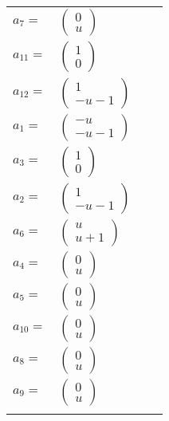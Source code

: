 \documentclass[1p]{elsarticle_modified}
\theoremstyle{definition}
\begin{document}
\begin{tabular}{m{7pt} m{180pt} m{7pt} m{180pt} }
\flushright $a_{7}=$&$\begin{pmatrix}0\\u\end{pmatrix}$ \\
\flushright $a_{11}=$&$\begin{pmatrix}1\\0\end{pmatrix}$ \\
\flushright $a_{12}=$&$\begin{pmatrix}1\\- u-1\end{pmatrix}$ \\
\flushright $a_{1}=$&$\begin{pmatrix}- u\\- u-1\end{pmatrix}$ \\
\flushright $a_{3}=$&$\begin{pmatrix}1\\0\end{pmatrix}$ \\
\flushright $a_{2}=$&$\begin{pmatrix}1\\- u-1\end{pmatrix}$ \\
\flushright $a_{6}=$&$\begin{pmatrix}u\\u+1\end{pmatrix}$ \\
\flushright $a_{4}=$&$\begin{pmatrix}0\\u\end{pmatrix}$ \\
\flushright $a_{5}=$&$\begin{pmatrix}0\\u\end{pmatrix}$ \\
\flushright $a_{10}=$&$\begin{pmatrix}0\\u\end{pmatrix}$ \\
\flushright $a_{8}=$&$\begin{pmatrix}0\\u\end{pmatrix}$ \\
\flushright $a_{9}=$&$\begin{pmatrix}0\\u\end{pmatrix}$\\&\end{tabular}
\end{document}
